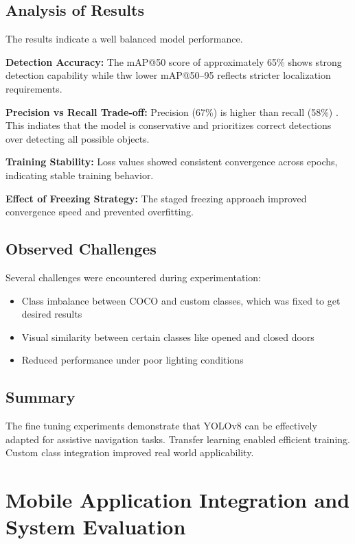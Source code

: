 \documentclass{FastFyp}
\begin{document}
\subsection{Analysis of Results}

The results indicate a well balanced model performance.

\textbf{Detection Accuracy:}  
The mAP@50 score of approximately 65\% shows strong detection capability while thw lower mAP@50--95 reflects stricter localization requirements.

\textbf{Precision vs Recall Trade-off:}  
Precision (67\%) is higher than recall (58\%) . This indiates that the model is conservative and prioritizes correct detections over detecting all possible objects.

\textbf{Training Stability:}  
Loss values showed consistent convergence across epochs, indicating stable training behavior.

\textbf{Effect of Freezing Strategy:}  
The staged freezing approach improved convergence speed and prevented overfitting.

\subsection{Observed Challenges}

Several challenges were encountered during experimentation:

\begin{itemize}
    \item Class imbalance between COCO and custom classes, which was fixed to get desired results
    \item Visual similarity between certain classes like opened and closed doors
    \item Reduced performance under poor lighting conditions
\end{itemize}

\subsection{Summary}

The fine tuning experiments demonstrate that YOLOv8 can be effectively adapted for assistive navigation tasks. Transfer learning enabled efficient training. Custom class integration improved real world applicability.

\section{Mobile Application Integration and System Evaluation}
\end{document}
